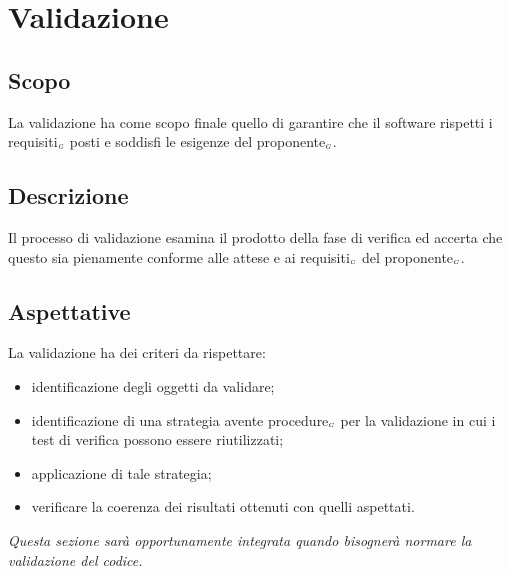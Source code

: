 \section{Validazione} \label{ProcessiDiSupportoValidazione}
\subsection{Scopo} \label{ProcessiDiSupportoValidazioneScopo}
La validazione ha come scopo finale quello di garantire che il software rispetti i requisiti$_{\scaleto{G}{3pt}}$ posti e soddisfi le esigenze del proponente$_{\scaleto{G}{3pt}}$.
\subsection{Descrizione} \label{ProcessiDiSupportoValidazioneDescrizione}
Il processo di validazione esamina il prodotto della fase di verifica ed accerta che questo sia pienamente conforme alle attese e ai requisiti$_{\scaleto{G}{3pt}}$ del proponente$_{\scaleto{G}{3pt}}$.
\subsection{Aspettative} \label{ProcessiDiSupportoValidazioneAspettative}
La validazione ha dei criteri da rispettare:
\begin{itemize}
	\item identificazione degli oggetti da validare;
	\item identificazione di una strategia avente procedure$_{\scaleto{G}{3pt}}$ per la validazione in cui i test di verifica possono essere riutilizzati;
	\item applicazione di tale strategia;
	\item verificare la coerenza dei risultati ottenuti con quelli aspettati.
\end{itemize}
\textit{Questa sezione sarà opportunamente integrata quando bisognerà normare la validazione del codice.}
